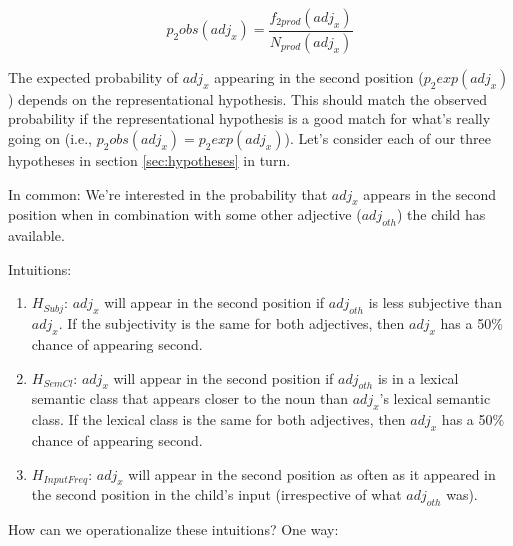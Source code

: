 \documentclass{article}
\begin{document}
\begin{equation}
\label{eq:p2obs}
p_2obs(adj_x) = \frac{f_{2prod}(adj_x)}{N_{prod}(adj_x)}
\end{equation}

The expected probability of $adj_x$ appearing in the second position ($p_2exp(adj_x)$) depends on the representational hypothesis. This should match the observed probability if the representational hypothesis is a good match for what's really going on (i.e., $p_2obs(adj_x)=p_2exp(adj_x)$). Let's consider each of our three hypotheses in section \ref{sec:hypotheses} in turn.

In common: We're interested in the probability that $adj_x$ appears in the second position when in combination with some other adjective ($adj_{oth}$) the child has available.

Intuitions:
\begin{enumerate}
\item{
$H_{Subj}$: $adj_x$ will appear in the second position if $adj_{oth}$ is less subjective than $adj_x$. 
If the subjectivity is the same for both adjectives, then $adj_x$ has a 50\% chance of appearing second.
}

\item{
$H_{SemCl}$: $adj_x$ will appear in the second position if $adj_{oth}$ is in a lexical semantic class that appears closer to the noun than $adj_x$'s lexical semantic class.
If the lexical class is the same for both adjectives, then $adj_x$ has a 50\% chance of appearing second.
}

\item{
$H_{InputFreq}$: $adj_x$ will appear in the second position as often as it appeared in the second position in the child's input (irrespective of what $adj_{oth}$ was).
}
\end{enumerate}

How can we operationalize these intuitions? One way:
\end{document}
